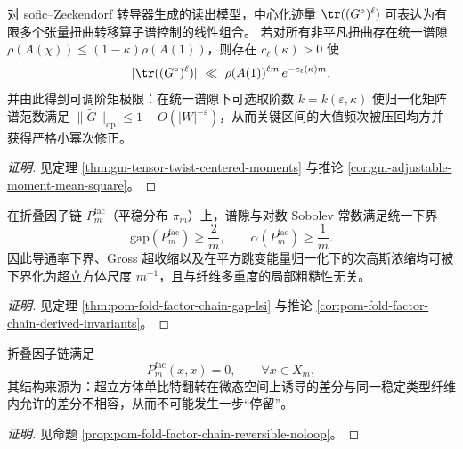 \begin{conclusion}[Sofic 扭曲算子的张量闭合：统一谱隙 \texorpdfstring{$\Rightarrow$}{=>} 全奇阶中心化迹指数压缩 \texorpdfstring{$\Rightarrow$}{=>} 可调阶矩把大值频次压回均方]\label{con:xi-terminal-sofic-tensor-twist-moment-compression}
对 sofic--Zeckendorf 转导器生成的读出模型，中心化迹量 \(\tr((G^\circ)^\ell)\) 可表达为有限多个张量扭曲转移算子谱控制的线性组合。
若对所有非平凡扭曲存在统一谱隙 \(\rho(A(\chi))\le (1-\kappa)\rho(A(1))\)，则存在 \(c_\ell(\kappa)>0\) 使
\[
|\tr((G^\circ)^\ell)|\ \ll\ \rho(A(1))^{\ell m}\,e^{-c_\ell(\kappa)m},
\]
并由此得到可调阶矩极限：在统一谱隙下可选取阶数 \(k=k(\varepsilon,\kappa)\) 使归一化矩阵谱范数满足 \(\|\widetilde G\|_{\mathrm{op}}\le 1+O(|W|^{-\varepsilon})\)，从而关键区间的大值频次被压回均方并获得严格小幂次修正。
\end{conclusion}
\begin{proof}[证明]
见定理 \ref{thm:gm-tensor-twist-centered-moments} 与推论 \ref{cor:gm-adjustable-moment-mean-square}。
\end{proof}

\begin{conclusion}\label{con:xi-terminal-factor-chain-gap-lsi-hypercontractive}
在折叠因子链 \(P^{\mathrm{fac}}_m\)（平稳分布 \(\pi_m\)）上，谱隙与对数 Sobolev 常数满足统一下界
\[
\mathrm{gap}(P^{\mathrm{fac}}_m)\ge \frac{2}{m},
\qquad
\alpha(P^{\mathrm{fac}}_m)\ge \frac{1}{m}.
\]
因此导通率下界、Gross 超收缩以及在平方跳变能量归一化下的次高斯浓缩均可被下界化为超立方体尺度 \(m^{-1}\)，且与纤维多重度的局部粗糙性无关。
\end{conclusion}
\begin{proof}[证明]
见定理 \ref{thm:pom-fold-factor-chain-gap-lsi} 与推论 \ref{cor:pom-fold-factor-chain-derived-invariants}。
\end{proof}

\begin{conclusion}\label{con:xi-terminal-factor-chain-no-self-loop}
折叠因子链满足
\[
P^{\mathrm{fac}}_m(x,x)=0,\qquad \forall x\in X_m,
\]
其结构来源为：超立方体单比特翻转在微态空间上诱导的差分与同一稳定类型纤维内允许的差分不相容，从而不可能发生一步“停留”。
\end{conclusion}
\begin{proof}[证明]
见命题 \ref{prop:pom-fold-factor-chain-reversible-noloop}。
\end{proof}

